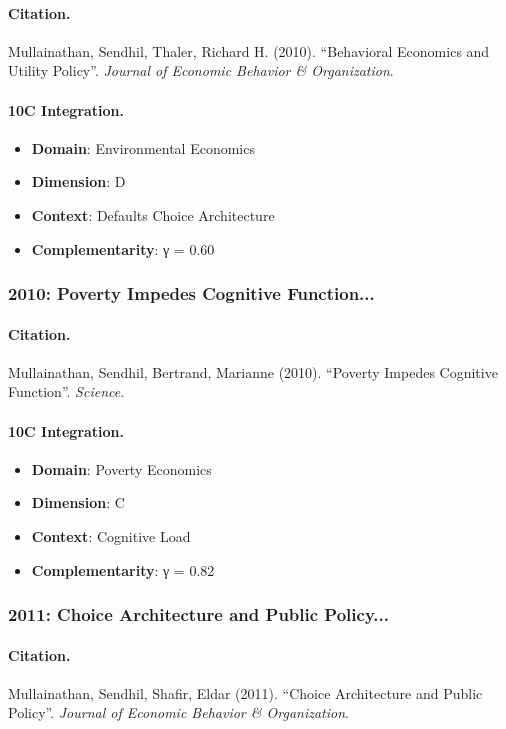 \paragraph{Citation.}
Mullainathan, Sendhil, Thaler, Richard H. (2010). ``Behavioral Economics and Utility Policy''. \textit{Journal of Economic Behavior & Organization}.

\paragraph{10C Integration.}
\begin{itemize}[nosep]
  \item \textbf{Domain}: Environmental Economics
  \item \textbf{Dimension}: D
  \item \textbf{Context}: Defaults Choice Architecture
  \item \textbf{Complementarity}: γ = 0.60
\end{itemize}


\subsubsection{2010: Poverty Impedes Cognitive Function...}

\paragraph{Citation.}
Mullainathan, Sendhil, Bertrand, Marianne (2010). ``Poverty Impedes Cognitive Function''. \textit{Science}.

\paragraph{10C Integration.}
\begin{itemize}[nosep]
  \item \textbf{Domain}: Poverty Economics
  \item \textbf{Dimension}: C
  \item \textbf{Context}: Cognitive Load
  \item \textbf{Complementarity}: γ = 0.82
\end{itemize}


\subsubsection{2011: Choice Architecture and Public Policy...}

\paragraph{Citation.}
Mullainathan, Sendhil, Shafir, Eldar (2011). ``Choice Architecture and Public Policy''. \textit{Journal of Economic Behavior & Organization}.


